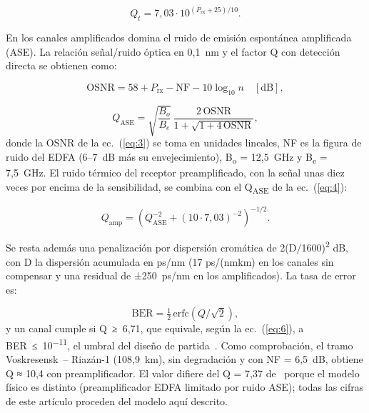 \documentclass[runningheads]{llncs}
\begin{document}
\begin{equation}
Q_t = 7{,}03 \cdot 10^{(P_{\mathrm{rx}} + 25)/10} .
\label{eq:2}
\end{equation}

En los canales amplificados domina el ruido de emisión espontánea amplificada (ASE). La relación señal/\allowbreak ruido óptica en 0,1~nm y el factor Q con detección directa se obtienen como:

\begin{equation}
\mathrm{OSNR} = 58 + P_{\mathrm{rx}} - \mathrm{NF} - 10\log_{10} n \quad [\mathrm{dB}] ,
\label{eq:3}
\end{equation}

\begin{equation}
Q_{\mathrm{ASE}} = \sqrt{\frac{B_o}{B_e}}\,\frac{2\,\mathrm{OSNR}}{1 + \sqrt{1 + 4\,\mathrm{OSNR}}} ,
\label{eq:4}
\end{equation}
donde la OSNR de la ec.~(\ref{eq:3}) se toma en unidades lineales, NF es la figura de ruido del EDFA (6–7~dB más su envejecimiento), B\textsubscript{o} = 12,5~GHz y B\textsubscript{e} = 7,5~GHz. El ruido térmico del receptor preamplificado, con la señal unas diez veces por encima de la sensibilidad, se combina con el Q\textsubscript{ASE} de la ec.~(\ref{eq:4}):

\begin{equation}
Q_{\mathrm{amp}} = \left(Q_{\mathrm{ASE}}^{-2} + (10 \cdot 7{,}03)^{-2}\right)^{-1/2} .
\label{eq:5}
\end{equation}

Se resta además una penalización por dispersión cromática de 2\textperiodcentered{}(D/1600)\textsuperscript{2} dB, con D la dispersión acumulada en ps/nm (17 ps/(nm\textperiodcentered{}km) en los canales sin compensar y una residual de ±250~ps/nm en los amplificados). La tasa de error es:

\begin{equation}
\mathrm{BER} = \tfrac{1}{2}\,\mathrm{erfc}\!\left(Q/\sqrt{2}\right) ,
\label{eq:6}
\end{equation}
y un canal cumple si Q~≥~6,71, que equivale, según la ec.~(\ref{eq:6}), a BER~≤~10\textsuperscript{−11}, el umbral del diseño de partida~\cite{acosta2026tfg}. Como comprobación, el tramo Voskresensk~– Riazán-1 (108,9~km), sin degradación y con NF = 6,5~dB, obtiene Q ≈ 10,4 con preamplificador. El valor difiere del Q = 7,37 de~\cite{acosta2026tfg} porque el modelo físico es distinto (preamplificador EDFA limitado por ruido ASE); todas las cifras de este artículo proceden del modelo aquí descrito.
\end{document}
